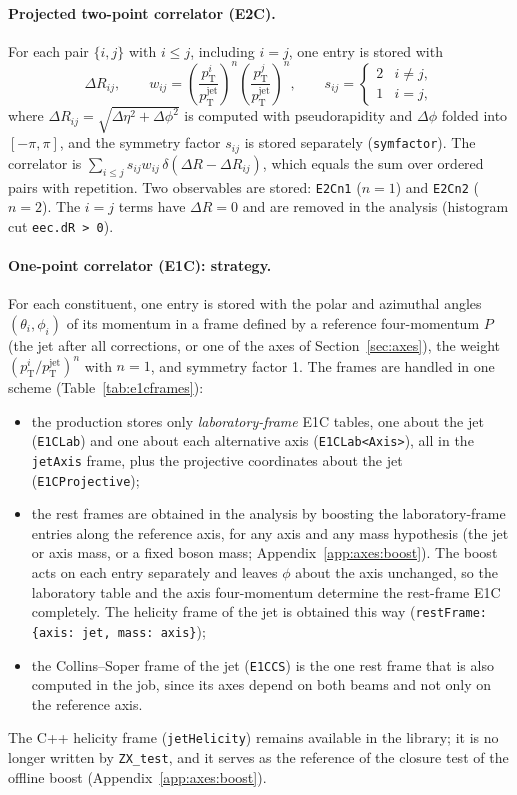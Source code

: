\documentclass[11pt]{article}
\newcommand{\pt}{p_{\mathrm{T}}}
\newcommand{\ptj}{\pt^{\mathrm{jet}}}
\newcommand{\code}[1]{\texttt{#1}}
\begin{document}
\paragraph{Projected two-point correlator (E2C).} For each pair $\{i, j\}$ with $i \leq j$, including $i = j$, one
entry is stored with
\begin{equation}
  \Delta R_{ij}, \qquad
  w_{ij} = \left(\frac{\pt^i}{\ptj}\right)^{n}\left(\frac{\pt^j}{\ptj}\right)^{n}, \qquad
  s_{ij} = \begin{cases} 2 & i \neq j, \\ 1 & i = j, \end{cases}
\end{equation}
where $\Delta R_{ij} = \sqrt{\Delta\eta^2 + \Delta\phi^2}$ is computed with pseudorapidity and $\Delta\phi$ folded into
$[-\pi,\pi]$, and the symmetry factor $s_{ij}$ is stored separately (\code{symfactor}). The correlator is
$\sum_{i\le j} s_{ij} w_{ij}\,\delta(\Delta R - \Delta R_{ij})$, which equals the sum over ordered pairs with
repetition. Two observables are stored: \code{E2Cn1} ($n = 1$) and \code{E2Cn2} ($n = 2$). The $i = j$ terms have
$\Delta R = 0$ and are removed in the analysis (histogram cut \code{eec.dR > 0}).

\paragraph{One-point correlator (E1C): strategy.} For each constituent, one entry is stored with the polar and
azimuthal angles $(\theta_i, \phi_i)$ of its momentum in a frame defined by a reference four-momentum $P$ (the jet after
all corrections, or one of the axes of Section~\ref{sec:axes}), the weight $(\pt^i/\ptj)^n$ with $n = 1$, and symmetry
factor 1. The frames are handled in one scheme (Table~\ref{tab:e1cframes}):
\begin{itemize}
\item the production stores only \emph{laboratory-frame} E1C tables, one about the jet (\code{E1CLab}) and one about
  each alternative axis (\code{E1CLab<Axis>}), all in the \code{jetAxis} frame, plus the projective coordinates about
  the jet (\code{E1CProjective});
\item the rest frames are obtained in the analysis by boosting the laboratory-frame entries along the reference axis,
  for any axis and any mass hypothesis (the jet or axis mass, or a fixed boson mass;
  Appendix~\ref{app:axes:boost}). The boost acts on each entry separately and leaves $\phi$ about the axis unchanged,
  so the laboratory table and the axis four-momentum determine the rest-frame E1C completely. The helicity frame of the
  jet is obtained this way (\code{restFrame: \{axis: jet, mass: axis\}});
\item the Collins--Soper frame of the jet (\code{E1CCS}) is the one rest frame that is also computed in the job, since
  its axes depend on both beams and not only on the reference axis.
\end{itemize}
The C++ helicity frame (\code{jetHelicity}) remains available in the library; it is no longer written by
\code{ZX\_test}, and it serves as the reference of the closure test of the offline boost
(Appendix~\ref{app:axes:boost}).
\end{document}
